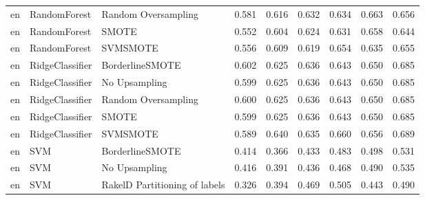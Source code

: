 \begin{tabular}{lllllllll}
      en &                    RandomForest &           Random Oversampling & 0.581 &                     0.616 &                 0.632 &                  0.634 &                                   0.663 &     0.656 \\
      en &                    RandomForest &                         SMOTE & 0.552 &                     0.604 &                 0.624 &                  0.631 &                                   0.658 &     0.644 \\
      en &                    RandomForest &                      SVMSMOTE & 0.556 &                     0.609 &                 0.619 &                  0.654 &                                   0.635 &     0.655 \\
      en &                 RidgeClassifier &               BorderlineSMOTE & 0.602 &                     0.625 &                 0.636 &                  0.643 &                                   0.650 &     0.685 \\
      en &                 RidgeClassifier &                 No Upsampling & 0.599 &                     0.625 &                 0.636 &                  0.643 &                                   0.650 &     0.685 \\
      en &                 RidgeClassifier &           Random Oversampling & 0.600 &                     0.625 &                 0.636 &                  0.643 &                                   0.650 &     0.685 \\
      en &                 RidgeClassifier &                         SMOTE & 0.599 &                     0.625 &                 0.636 &                  0.643 &                                   0.650 &     0.685 \\
      en &                 RidgeClassifier &                      SVMSMOTE & 0.589 &                     0.640 &                 0.635 &                  0.660 &                                   0.656 &     0.689 \\
      en &                             SVM &               BorderlineSMOTE & 0.414 &                     0.366 &                 0.433 &                  0.483 &                                   0.498 &     0.531 \\
      en &                             SVM &                 No Upsampling & 0.416 &                     0.391 &                 0.436 &                  0.468 &                                   0.490 &     0.535 \\
      en &                             SVM & RakelD Partitioning of labels & 0.326 &                     0.394 &                 0.469 &                  0.505 &                                   0.443 &     0.490 \\

\end{tabular}
